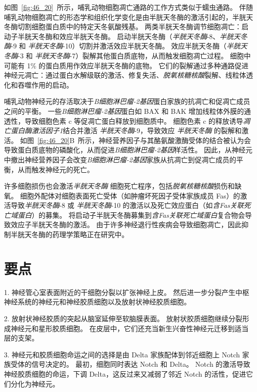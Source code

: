 如图~\ref{fig:46_20}~所示，哺乳动物细胞凋亡通路的工作方式类似于蠕虫通路。
伴随哺乳动物细胞凋亡的形态学和组织化学变化是由半胱天冬酶的激活引起的，半胱天冬酶切割细胞蛋白质中的特定天冬氨酸残基。
两类半胱天冬酶调节细胞凋亡：启动子半胱天冬酶和效应半胱天冬酶。
启动半胱天冬酶（\textit{半胱天冬酶}-8、\textit{半胱天冬酶}-9 和 \textit{半胱天冬酶}-10）切割并激活效应半胱天冬酶。
效应半胱天冬酶（\textit{半胱天冬酶}-3 和 \textit{半胱天冬酶}-7）裂解其他蛋白质底物，从而触发细胞凋亡过程。
细胞中可能有 1\% 的蛋白质用作效应半胱天冬酶的底物。
它们的裂解通过多种通路促进神经元凋亡：通过蛋白水解级联的激活、修复失活、\textit{脱氧核糖核酸}裂解、线粒体透化和吞噬作用的启动。


哺乳动物神经元的存活取决于\textit{B细胞淋巴瘤-2基因}蛋白家族的抗凋亡和促凋亡成员之间的平衡。
一些\textit{B细胞淋巴瘤-2基因}蛋白如 BAX 和 BAK 增加线粒体外膜的通透性，导致细胞色素 c 等促凋亡蛋白释放到细胞质中。
细胞色素 c 的释放诱导\textit{凋亡蛋白酶激活因子1}结合并激活 \textit{半胱天冬酶}-9，导致效应 \textit{半胱天冬酶} 的裂解和激活。
如图~\ref{fig:46_20}B~所示，神经营养因子与其酪氨酸激酶受体的结合被认为会导致蛋白质底物的磷酸化，从而促进\textit{B细胞淋巴瘤-2基因}样活性。
因此，从神经元中撤出神经营养因子会改变\textit{B细胞淋巴瘤-2基因}家族从抗凋亡到促凋亡成员的平衡，从而触发神经元的死亡。


许多细胞损伤也会激活\textit{半胱天冬酶} 细胞死亡程序，包括\textit{脱氧核糖核酸}损伤和缺氧。
细胞外配体对细胞表面死亡受体（如肿瘤坏死因子受体家族成员 Fas）的激活导致\textit{半胱天冬酶}-8 或 \textit{半胱天冬酶}-10 的激活以及死亡效应蛋白（如\textit{含Fas关联死亡域蛋白}）的募集。
将启动子半胱天冬酶募集到\textit{含Fas关联死亡域蛋白}复合物会导致效应子半胱天冬酶的激活。
由于许多神经退行性疾病会导致细胞凋亡，因此抑制半胱天冬酶的药理学策略正在研究中。



\section{要点}

1. 神经管心室表面附近的干细胞分裂以扩张神经上皮。
然后进一步分裂产生中枢神经系统的神经元和神经胶质细胞以及放射状神经胶质细胞。


2. 放射状神经胶质的突起从脑室延伸至软脑膜表面。
放射状胶质细胞继续分裂形成神经元和星形胶质细胞。
在皮层中，它们还充当新生兴奋性神经元迁移到适当层的支架。


3. 神经元和胶质细胞命运之间的选择是由 Delta 家族配体到邻近细胞上 Notch 家族受体的信号决定的。
最初，细胞同时表达 Notch 和 Delta。
Notch 的激活导致神经胶质细胞的命运，下调 Delta，这反过来又减弱了邻近 Notch 的活性，促进它们分化为神经元。


